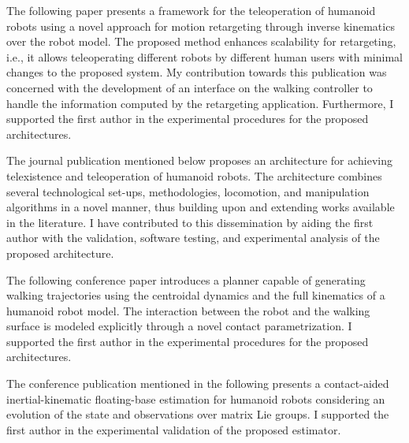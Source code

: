 The following paper presents a framework for the teleoperation of humanoid robots using a novel approach for motion retargeting through inverse kinematics over the robot model. The proposed method enhances scalability for retargeting, i.e., it allows teleoperating different robots by different human users with minimal changes to the proposed system. My contribution towards this publication was concerned with the development of an interface on the walking controller to handle the information computed by the retargeting application. Furthermore, I supported the first author in the experimental procedures for the proposed architectures. 

The journal publication mentioned below proposes an architecture for achieving telexistence and teleoperation of humanoid robots. The architecture combines several technological set-ups, methodologies, locomotion, and manipulation algorithms in a novel manner, thus building upon and extending works available in the literature. I have contributed to this dissemination by aiding the first author with the validation, software testing, and experimental analysis of the proposed architecture. 

The following conference paper introduces a planner capable of generating walking trajectories using the centroidal dynamics and the full kinematics of a humanoid robot model. The interaction between the robot and the walking surface is modeled explicitly through a novel contact parametrization. I supported the first author in the experimental procedures for the proposed architectures. 

The conference publication mentioned in the following presents a contact-aided inertial-kinematic floating-base estimation for humanoid robots considering an evolution of the state and observations over matrix Lie groups. I supported the first author in the experimental validation of the proposed estimator. 


